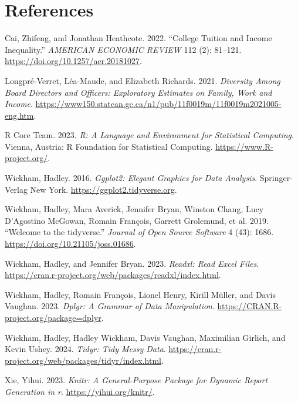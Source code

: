\documentclass[
  letterpaper,
  DIV=11,
  numbers=noendperiod]{scrartcl}
\newlength{\cslhangindent}
\newenvironment{CSLReferences}[2] %
 {\begin{list}{}{%
  \setlength{\itemindent}{0pt}
  \setlength{\leftmargin}{0pt}
  \setlength{\parsep}{0pt}
  \ifodd #1
   \setlength{\leftmargin}{\cslhangindent}
   \setlength{\itemindent}{-1\cslhangindent}
  \fi
  \setlength{\itemsep}{#2\baselineskip}}}
 {\end{list}}
\begin{document}
\newpage

\section*{References}\label{references}

\label{refs}
\begin{CSLReferences}{1}{0}
Cai, Zhifeng, and Jonathan Heathcote. 2022. {``College Tuition and
Income Inequality.''} \emph{AMERICAN ECONOMIC REVIEW} 112 (2): 81--121.
\url{https://doi.org/10.1257/aer.20181027}.

Longpré-Verret, Léa-Maude, and Elizabeth Richards. 2021. \emph{Diversity
Among Board Directors and Officers: Exploratory Estimates on Family,
Work and Income}.
\url{https://www150.statcan.gc.ca/n1/pub/11f0019m/11f0019m2021005-eng.htm}.

R Core Team. 2023. \emph{R: A Language and Environment for Statistical
Computing}. Vienna, Austria: R Foundation for Statistical Computing.
\url{https://www.R-project.org/}.

Wickham, Hadley. 2016. \emph{Ggplot2: Elegant Graphics for Data
Analysis}. Springer-Verlag New York.
\url{https://ggplot2.tidyverse.org}.

Wickham, Hadley, Mara Averick, Jennifer Bryan, Winston Chang, Lucy
D'Agostino McGowan, Romain François, Garrett Grolemund, et al. 2019.
{``Welcome to the {tidyverse}.''} \emph{Journal of Open Source Software}
4 (43): 1686. \url{https://doi.org/10.21105/joss.01686}.

Wickham, Hadley, and Jennifer Bryan. 2023. \emph{Readxl: Read Excel
Files}. \url{https://cran.r-project.org/web/packages/readxl/index.html}.

Wickham, Hadley, Romain François, Lionel Henry, Kirill Müller, and Davis
Vaughan. 2023. \emph{Dplyr: A Grammar of Data Manipulation}.
\url{https://CRAN.R-project.org/package=dplyr}.

Wickham, Hadley, Hadley Wickham, Davis Vaughan, Maximilian Girlich, and
Kevin Ushey. 2024. \emph{Tidyr: Tidy Messy Data}.
\url{https://cran.r-project.org/web/packages/tidyr/index.html}.

Xie, Yihui. 2023. \emph{Knitr: A General-Purpose Package for Dynamic
Report Generation in r}. \url{https://yihui.org/knitr/}.

\end{CSLReferences}
\end{document}
